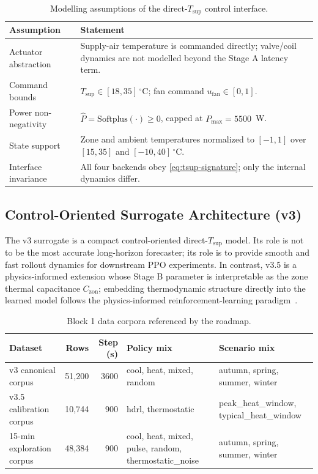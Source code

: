 \documentclass[11pt,a4paper]{article}
\newcommand{\Czon}{\ensuremath{C_{\mathrm{zon}}}}
\newcommand{\Tsupply}{\ensuremath{T_{\mathrm{sup}}}}
\begin{document}
\begin{table}[H]
\centering
\small
\caption{Modelling assumptions of the direct-\Tsupply{} control interface.}
\label{tab:tsup-assumptions}
\begin{tabularx}{\linewidth}{lX}
\toprule
Assumption & Statement \\
\midrule
Actuator abstraction & Supply-air temperature is commanded directly; valve/coil dynamics are not modelled beyond the Stage A latency term. \\
Command bounds & \(\Tsupply\in[18,35]\,^\circ\)C; fan command \(u_{\mathrm{fan}}\in[0,1]\). \\
Power non-negativity & \(\widehat{P}=\mathrm{Softplus}(\cdot)\ge 0\), capped at \(P_{\max}=5500\)~W. \\
State support & Zone and ambient temperatures normalized to \([-1,1]\) over \([15,35]\) and \([-10,40]\,^\circ\)C. \\
Interface invariance & All four backends obey \eqref{eq:tsup-signature}; only the internal dynamics differ. \\
\bottomrule
\end{tabularx}
\end{table}

\subsection{Control-Oriented Surrogate Architecture (v3)}
\label{ssec:block1-v3}

The v3 surrogate is a compact control-oriented direct-\Tsupply{} model. Its role is not to be the most accurate long-horizon forecaster; its role is to provide smooth and fast rollout dynamics for downstream PPO experiments. In contrast, v3.5 is a physics-informed extension whose Stage B parameter is interpretable as the zone thermal capacitance \(\Czon\); embedding thermodynamic structure directly into the learned model follows the physics-informed reinforcement-learning paradigm~\citep{Hedayat2025PINN}.

\begin{table}[H]
\centering
\small
\caption{Block 1 data corpora referenced by the roadmap.}
\label{tab:block1-corpora}
\begin{tabularx}{\linewidth}{lrrXX}
\toprule
Dataset & Rows & Step (s) & Policy mix & Scenario mix \\
\midrule
v3 canonical corpus & 51,200 & 3600 & cool, heat, mixed, random & autumn, spring, summer, winter \\
v3.5 calibration corpus & 10,744 & 900 & hdrl, thermostatic & peak\_heat\_window, typical\_heat\_window \\
15-min exploration corpus & 48,384 & 900 & cool, heat, mixed, pulse, random, thermostatic\_noise & autumn, spring, summer, winter \\
\bottomrule
\end{tabularx}
\end{table}
\end{document}
